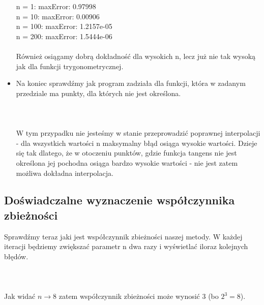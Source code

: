 \documentclass{article}
\begin{document}
\begin{itemize}
{{	n = 1: maxError: 0.97998\\
	n = 10: maxError: 0.00906\\
	n = 100: maxError: 1.2157e-05\\
	n = 200: maxError: 1.5444e-06
	}
}\\\\
Również osiągamy dobrą dokładność dla wysokich n, lecz już nie tak wysoką jak dla funkcji trygonometrycznej.
\item
Na koniec sprawdźmy jak program zadziała dla funkcji, która w zadanym przedziale ma punkty, dla których nie jest określona.\\\\
\noindent{}\\\\
W tym przypadku nie jesteśmy w stanie przeprowadzić poprawnej interpolacji - dla wszystkich wartości n maksymalny błąd osiąga wysokie wartości. Dzieje się tak dlatego, że w otoczeniu punktów, gdzie funkcja tangens nie jest określona jej pochodna osiąga bardzo wysokie wartości - nie jest zatem możliwa dokładna interpolacja.
\end{itemize}
\newpage
\subsection{Doświadczalne wyznaczenie współczynnika zbieżności}
Sprawdźmy teraz jaki jest współczynnik zbieżności naszej metody. W każdej iteracji będziemy zwiększać parametr n dwa razy i wyświetlać iloraz kolejnych błędów.
\\\\
\noindent{}\\\\
Jak widać $n\rightarrow8$ zatem współczynnik zbieżności może wynosić 3 (bo $2^3=8$).
\end{document}
